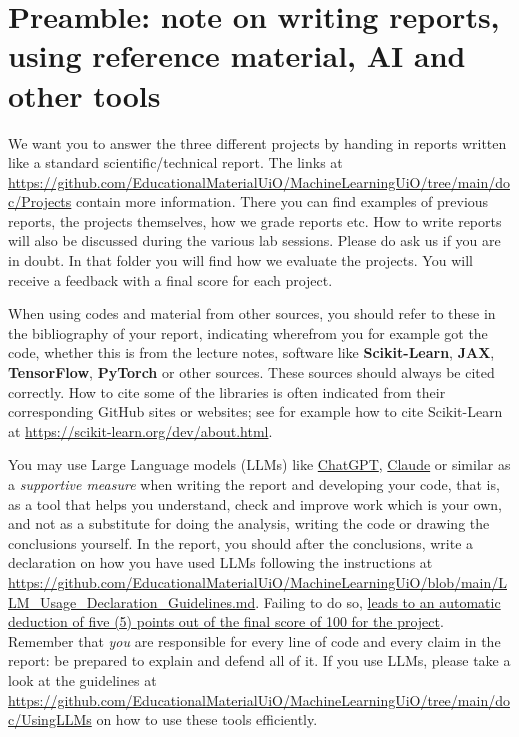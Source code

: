 \documentclass[11pt,a4paper]{article}
\begin{document}
\section*{Preamble: note on writing reports, using reference material, AI and other tools}

We want you to answer the three different projects by handing in
reports written like a standard scientific/technical report.  The links at
\url{https://github.com/EducationalMaterialUiO/MachineLearningUiO/tree/main/doc/Projects}
contain more information.  There you can find examples of previous reports,
the projects themselves, how we grade reports etc.  How to write reports will
also be discussed during the various lab sessions.  Please do ask us if you
are in doubt. In that folder you will find how we evaluate the projects. You will receive a feedback with a final score for each project.

When using codes and material from other sources, you should refer to these
in the bibliography of your report, indicating wherefrom you for example got
the code, whether this is from the lecture notes, software like
\textbf{Scikit-Learn}, \textbf{JAX}, \textbf{TensorFlow}, \textbf{PyTorch} or other
sources.  These sources should always be cited correctly.  How to cite some of
the libraries is often indicated from their corresponding GitHub sites or
websites; see for example how to cite Scikit-Learn at
\url{https://scikit-learn.org/dev/about.html}.

You may use Large Language models (LLMs) like \href{https://openai.com/chatgpt/}{ChatGPT},
\href{https://claude.ai}{Claude} or similar as a \emph{supportive measure} when
writing the report and developing your code, that is, as a tool that helps you
understand, check and improve work which is your own, and not as a substitute
for doing the analysis, writing the code or drawing the conclusions yourself.
In the report, you should after the conclusions, write a declaration on how you have used LLMs following the instructions at \url{https://github.com/EducationalMaterialUiO/MachineLearningUiO/blob/main/LLM_Usage_Declaration_Guidelines.md}. Failing to do so, \uline{leads to an automatic deduction of five (5) points out of the final score of 100 for the  project}.
Remember that \emph{you} are responsible for every
line of code and every claim in the report: be prepared to explain and defend
all of it.
If you use LLMs, please take a look at the guidelines at \url{https://github.com/EducationalMaterialUiO/MachineLearningUiO/tree/main/doc/UsingLLMs} on how to use these tools efficiently.
\end{document}
